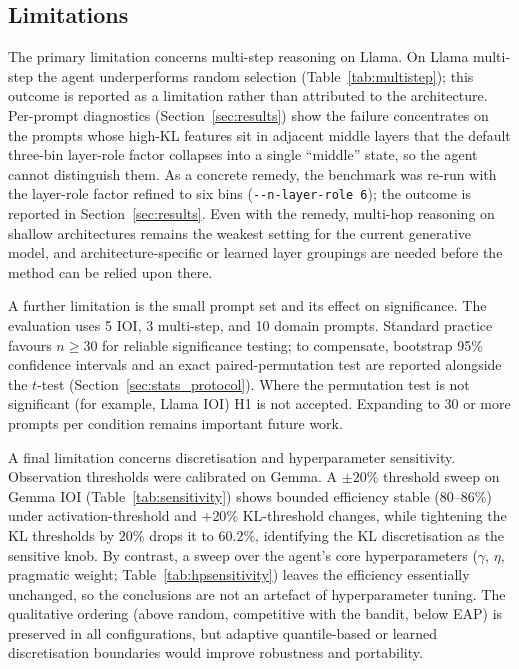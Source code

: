\subsection{Limitations}

The primary limitation concerns multi-step reasoning on Llama. On Llama multi-step the
agent underperforms random selection (Table~\ref{tab:multistep}); this outcome is
reported as a limitation rather than attributed to the architecture. Per-prompt diagnostics
(Section~\ref{sec:results}) show the failure concentrates on the prompts whose
high-KL features sit in adjacent middle layers that the default three-bin layer-role
factor collapses into a single ``middle'' state, so the agent cannot distinguish
them. As a concrete remedy, the benchmark was re-run with the
layer-role factor refined to six bins (\texttt{-{}-n-layer-role 6}); the outcome is
reported in Section~\ref{sec:results}. Even with the remedy,
multi-hop reasoning on shallow architectures remains the weakest setting for the
current generative model, and architecture-specific or learned layer groupings
are needed before the method can be relied upon there.

A further limitation is the small prompt set and its effect on significance. The evaluation uses 5 IOI, 3
multi-step, and 10 domain prompts. Standard practice favours $n \geq 30$ for reliable
significance testing; to compensate, bootstrap 95\% confidence intervals and
an exact paired-permutation test are reported alongside the $t$-test
(Section~\ref{sec:stats_protocol}). Where the permutation test is not significant
(for example, Llama IOI) H1 is not accepted. Expanding to 30 or more prompts per
condition remains important future work.

A final limitation concerns discretisation and hyperparameter sensitivity. Observation thresholds were
calibrated on Gemma. A $\pm 20\%$ threshold sweep on Gemma IOI
(Table~\ref{tab:sensitivity}) shows bounded efficiency stable (80--86\%) under
activation-threshold and $+20\%$ KL-threshold changes, while tightening the KL
thresholds by $20\%$ drops it to $60.2\%$, identifying the KL discretisation as the
sensitive knob. By contrast, a sweep over the agent's core hyperparameters
($\gamma$, $\eta$, pragmatic weight; Table~\ref{tab:hpsensitivity}) leaves the
efficiency essentially unchanged, so the conclusions are not an artefact of
hyperparameter tuning. The qualitative ordering (above random, competitive with the
bandit, below EAP) is preserved in all configurations, but adaptive quantile-based or
learned discretisation boundaries would improve robustness and portability.

